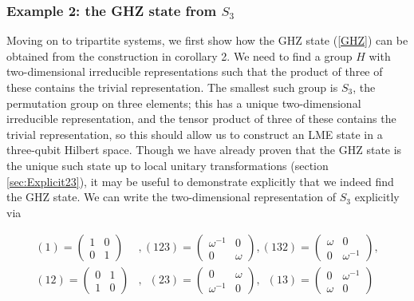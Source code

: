 \documentclass[12pt]{article}
\theoremstyle{definition}
\newcommand{\be}{\begin{equation}}
\newcommand{\ee}{\end{equation}}
\newcommand{\ba}{\begin{array}}
\newcommand{\ea}{\end{array}}
\begin{document}
\subsubsection*{Example 2: the GHZ state from $S_3$}

Moving on to tripartite systems, we first show how the GHZ state
(\ref{GHZ}) can be obtained from the construction in corollary 2. We
need to find a group $H$ with two-dimensional irreducible
representations such that the product of three of these contains the
trivial representation. The smallest such group is $S_3$, the
permutation group on three elements; this has a unique two-dimensional
irreducible representation, and the tensor product of three of these
contains the trivial representation, so this should allow us to
construct an LME state in a three-qubit Hilbert space. Though we have
already proven that the GHZ state is the unique such state up to local
unitary transformations (section \ref{sec:Explicit23}), it may be
useful to demonstrate explicitly that we indeed find the GHZ state. We
can write the two-dimensional representation of $S_3$ explicitly via

\begin{align*}
(1)  = \left(\begin{matrix} 1&0\\0&1 \end{matrix} \right)&, (123)=\left( \begin{matrix} \omega^{-1}&0\\0&\omega  \end{matrix} \right), (132)=\left( \begin{matrix} \omega&0\\0&\omega^{-1}  \end{matrix} \right),\\
 (12)=\left( \begin{matrix} 0&1\\1&0 \end{matrix} \right)&,\, \, \,  (23)=\left( \begin{matrix} 0&\omega \\\omega^{-1}&0 \end{matrix} \right),\, \, \,  (13)=\left( \begin{matrix} 0&\omega^{-1} \\\omega&0 \end{matrix} \right)
\end{align*}

\end{document}

